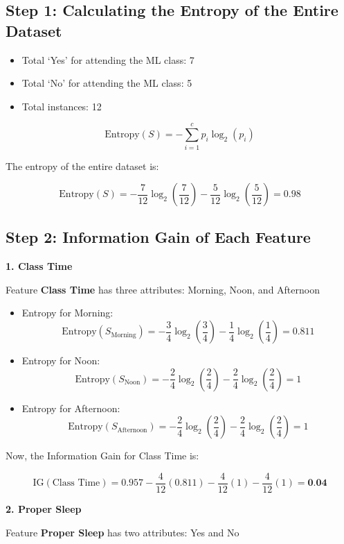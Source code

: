 \documentclass{article}
\begin{document}
\subsection*{Step 1: Calculating the Entropy of the Entire Dataset}
\begin{itemize}
    \item Total `Yes' for attending the ML class: 7
    \item Total `No' for attending the ML class: 5
    \item Total instances: 12
\end{itemize}

\[
\text{Entropy}(S) = - \sum_{i=1}^{c} p_i \log_2(p_i)
\]

The entropy of the entire dataset is:

\[
\text{Entropy}(S) = -\frac{7}{12} \log_2\left(\frac{7}{12}\right) - \frac{5}{12} \log_2\left(\frac{5}{12}\right) = 0.98
\]

\subsection*{Step 2: Information Gain of Each Feature}

\textbf{1. Class Time}

Feature \textbf{Class Time} has three attributes: Morning, Noon, and Afternoon
\begin{itemize}
    \item Entropy for Morning: 
    \[
    \text{Entropy}(S_{\text{Morning}}) = -\frac{3}{4} \log_2\left(\frac{3}{4}\right) - \frac{1}{4} \log_2\left(\frac{1}{4}\right) = 0.811
    \]
    \item Entropy for Noon: 
    \[
    \text{Entropy}(S_{\text{Noon}}) = -\frac{2}{4} \log_2\left(\frac{2}{4}\right) - \frac{2}{4} \log_2\left(\frac{2}{4}\right) = 1
    \]
    \item Entropy for Afternoon: 
    \[
    \text{Entropy}(S_{\text{Afternoon}}) = -\frac{2}{4} \log_2\left(\frac{2}{4}\right) - \frac{2}{4} \log_2\left(\frac{2}{4}\right) = 1
    \]
\end{itemize}

Now, the Information Gain for Class Time is:

\[
\text{IG}(\text{Class Time}) = 0.957 - \frac{4}{12}(0.811) - \frac{4}{12}(1) - \frac{4}{12}(1) = \textbf{0.04}
\]

\hspace{-20pt}
\textbf{2. Proper Sleep}

Feature \textbf{Proper Sleep} has two attributes: Yes and No
\end{document}
